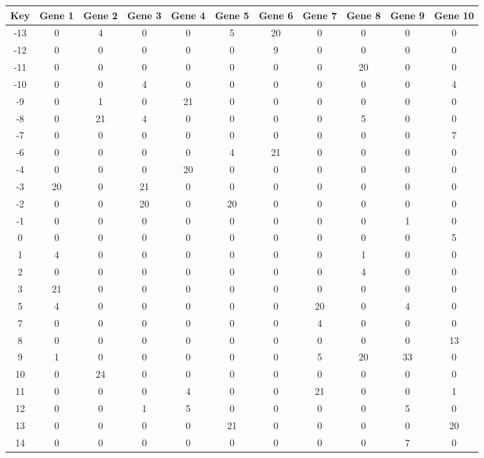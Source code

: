 \begin{tabular}{|c|c|c|c|c|c|c|c|c|c|c|}
\hline
Key & Gene 1 & Gene 2 & Gene 3 & Gene 4 & Gene 5 & Gene 6 & Gene 7 & Gene 8 & Gene 9 & Gene 10 \\
\hline
-13 & 0 & 4 & 0 & 0 & 5 & 20 & 0 & 0 & 0 & 0 \\
-12 & 0 & 0 & 0 & 0 & 0 & 9 & 0 & 0 & 0 & 0 \\
-11 & 0 & 0 & 0 & 0 & 0 & 0 & 0 & 20 & 0 & 0 \\
-10 & 0 & 0 & 4 & 0 & 0 & 0 & 0 & 0 & 0 & 4 \\
-9 & 0 & 1 & 0 & 21 & 0 & 0 & 0 & 0 & 0 & 0 \\
-8 & 0 & 21 & 4 & 0 & 0 & 0 & 0 & 5 & 0 & 0 \\
-7 & 0 & 0 & 0 & 0 & 0 & 0 & 0 & 0 & 0 & 7 \\
-6 & 0 & 0 & 0 & 0 & 4 & 21 & 0 & 0 & 0 & 0 \\
-4 & 0 & 0 & 0 & 20 & 0 & 0 & 0 & 0 & 0 & 0 \\
-3 & 20 & 0 & 21 & 0 & 0 & 0 & 0 & 0 & 0 & 0 \\
-2 & 0 & 0 & 20 & 0 & 20 & 0 & 0 & 0 & 0 & 0 \\
-1 & 0 & 0 & 0 & 0 & 0 & 0 & 0 & 0 & 1 & 0 \\
0 & 0 & 0 & 0 & 0 & 0 & 0 & 0 & 0 & 0 & 5 \\
1 & 4 & 0 & 0 & 0 & 0 & 0 & 0 & 1 & 0 & 0 \\
2 & 0 & 0 & 0 & 0 & 0 & 0 & 0 & 4 & 0 & 0 \\
3 & 21 & 0 & 0 & 0 & 0 & 0 & 0 & 0 & 0 & 0 \\
5 & 4 & 0 & 0 & 0 & 0 & 0 & 20 & 0 & 4 & 0 \\
7 & 0 & 0 & 0 & 0 & 0 & 0 & 4 & 0 & 0 & 0 \\
8 & 0 & 0 & 0 & 0 & 0 & 0 & 0 & 0 & 0 & 13 \\
9 & 1 & 0 & 0 & 0 & 0 & 0 & 5 & 20 & 33 & 0 \\
10 & 0 & 24 & 0 & 0 & 0 & 0 & 0 & 0 & 0 & 0 \\
11 & 0 & 0 & 0 & 4 & 0 & 0 & 21 & 0 & 0 & 1 \\
12 & 0 & 0 & 1 & 5 & 0 & 0 & 0 & 0 & 5 & 0 \\
13 & 0 & 0 & 0 & 0 & 21 & 0 & 0 & 0 & 0 & 20 \\
14 & 0 & 0 & 0 & 0 & 0 & 0 & 0 & 0 & 7 & 0 \\
\hline
\end{tabular}